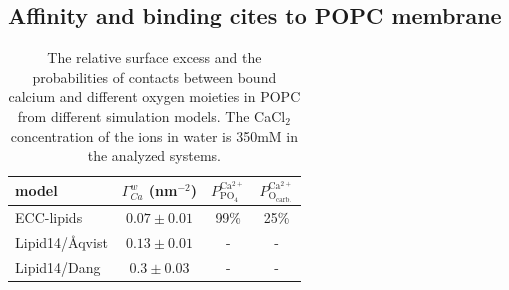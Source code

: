\documentclass[aip,jcp,twocolumn]{revtex4}
\begin{document}
\subsection{Affinity and binding cites to POPC membrane}

\begin{table}
  \caption{The relative surface excess and the probabilities of contacts between bound calcium and different
    oxygen moieties in POPC from different simulation models. The CaCl$_2$ concentration of the ions in water
    is 350mM in the analyzed systems. \label{tab:binding}}
  \begin{tabular}{l|c c c}
    model                 & $\Gamma_{Ca}^w$ (nm$^{-2}$)   & $P^\mathrm{Ca^{2+}} _\mathrm{PO_4} $ & $P^\mathrm{Ca^{2+}} _\mathrm{O_{carb.}} $ \\
    \hline
    ECC-lipids            &  $0.07 \pm 0.01 $            &  99\%   &    25\%    \\
    Lipid14/\AA{}qvist    &  $0.13 \pm 0.01 $            &  -       &     -       \\
    Lipid14/Dang          &  $ 0.3 \pm 0.03  $           &  -        &    -       \\
  \end{tabular}
\end{table}
\end{document}

